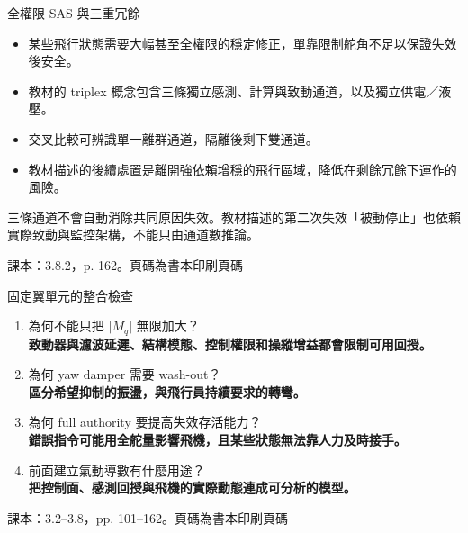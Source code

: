 \documentclass[aspectratio=169,11pt]{beamer}
\newcommand{\src}[1]{\par\vfill{\scriptsize\color{teal}#1}}
\newcommand{\slide}[3]{\begin{frame}[t]{#1}#3\src{#2}\end{frame}}
\newcommand{\bi}{\begin{itemize}\setlength{\itemsep}{5pt}}
\newcommand{\ei}{\end{itemize}}
\newcommand{\key}[1]{\par\medskip{\color{teal}\bfseries #1}\par\smallskip}
\newcommand{\bookslide}[3]{\slide{#1}{課本：#2。頁碼為書本印刷頁碼}{#3}}
\begin{document}
\bookslide{全權限 SAS 與三重冗餘}{3.8.2，p. 162}{
\bi
\item 某些飛行狀態需要大幅甚至全權限的穩定修正，單靠限制舵角不足以保證失效後安全。
\item 教材的 triplex 概念包含三條獨立感測、計算與致動通道，以及獨立供電／液壓。
\item 交叉比較可辨識單一離群通道，隔離後剩下雙通道。
\item 教材描述的後續處置是離開強依賴增穩的飛行區域，降低在剩餘冗餘下運作的風險。
\ei
\key{架構限制}三條通道不會自動消除共同原因失效。教材描述的第二次失效「被動停止」也依賴實際致動與監控架構，不能只由通道數推論。
}
\bookslide{固定翼單元的整合檢查}{3.2--3.8，pp. 101--162}{
\begin{enumerate}\setlength{\itemsep}{7pt}
\item 為何不能只把 $\lvert M_q\rvert$ 無限加大？\\
\textbf{致動器與濾波延遲、結構模態、控制權限和操縱增益都會限制可用回授。}
\item 為何 yaw damper 需要 wash-out？\\
\textbf{區分希望抑制的振盪，與飛行員持續要求的轉彎。}
\item 為何 full authority 要提高失效存活能力？\\
\textbf{錯誤指令可能用全舵量影響飛機，且某些狀態無法靠人力及時接手。}
\item 前面建立氣動導數有什麼用途？\\
\textbf{把控制面、感測回授與飛機的實際動態連成可分析的模型。}
\end{enumerate}
}
\end{document}
